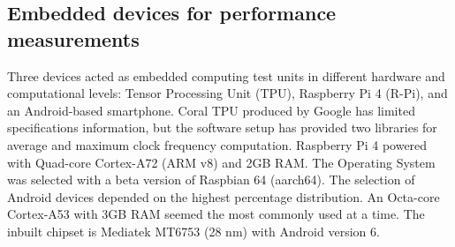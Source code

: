 \subsection{Embedded devices for performance measurements}
Three devices acted as embedded computing test units in different hardware and computational levels: Tensor Processing Unit (TPU), Raspberry Pi 4 (R-Pi), and an Android-based smartphone.
Coral TPU produced by Google has limited specifications information, but the software setup has provided two libraries for average and maximum clock frequency computation.
Raspberry Pi 4 powered with Quad-core Cortex-A72 (ARM v8) and 2GB RAM.
The Operating System was selected with a beta version of Raspbian 64 (aarch64).
The selection of Android devices depended on the highest percentage distribution.
An Octa-core Cortex-A53 with 3GB RAM seemed the most commonly used at a time.
The inbuilt chipset is Mediatek MT6753 (28 nm) with Android version 6.







